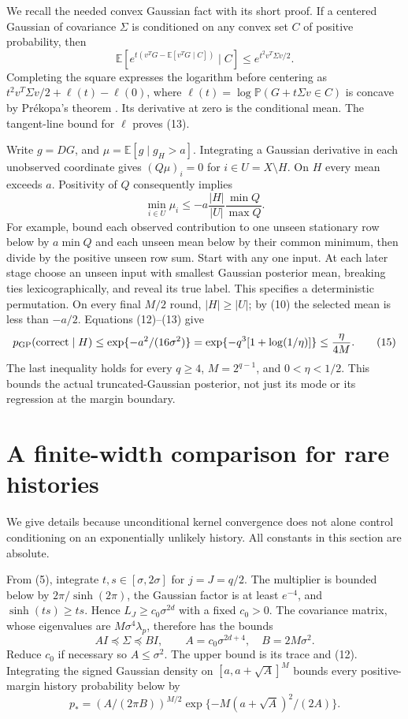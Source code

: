 \documentclass[11pt]{article}
\newcommand{\E}{\mathbb E}\newcommand{\Pp}{\mathbb P}
\begin{document}
We recall the needed convex Gaussian fact with its short proof.
If a centered Gaussian of covariance $\Sigma$ is conditioned on any
convex set $C$ of positive probability, then
\[
 \E[e^{t(v^TG-\E[v^TG\mid C])}\mid C]
                               \le e^{t^2v^T\Sigma v/2}.       \tag{13}
\]
Completing the square expresses the logarithm before centering as
$t^2v^T\Sigma v/2+\ell(t)-\ell(0)$, where
$\ell(t)=\log\Pp(G+t\Sigma v\in C)$ is concave by Pr\'ekopa's
theorem \cite{prekopa}. Its derivative at zero is the conditional
mean. The tangent-line bound for $\ell$ proves (13).

Write $g=DG$, and $\mu=\E[g\mid g_H>a]$.
Integrating a Gaussian derivative in each unobserved coordinate gives
$(Q\mu)_i=0$ for $i\in U=X\setminus H$.
On $H$ every mean exceeds $a$. Positivity of $Q$ consequently implies
\[
 \min_{i\in U}\mu_i
       \le-a\frac{|H|}{|U|}\frac{\min Q}{\max Q}.              \tag{14}
\]
For example, bound each observed contribution to one unseen stationary
row below by $a\min Q$ and each unseen mean below by their common
minimum, then divide by the positive unseen row sum.
Start with any one input. At each later stage choose an unseen input
with smallest Gaussian posterior mean, breaking ties lexicographically,
and reveal its true label. This specifies a deterministic permutation.
On every final $M/2$ round, $|H|\ge|U|$; by (10) the selected mean
is less than $-a/2$. Equations (12)--(13) give
\[
 p_{\rm GP}(\mathrm{correct}\mid H)
    \le\exp\{-a^2/(16\sigma^2)\}
    =\exp\{-q^3[1+\log(1/\eta)]\}\le\frac\eta{4M}.             \tag{15}
\]
The last inequality holds for every $q\ge4$, $M=2^{q-1}$,
and $0<\eta<1/2$. This bounds the actual truncated-Gaussian posterior,
not just its mode or its regression at the margin boundary.

\section{A finite-width comparison for rare histories}
We give details because unconditional kernel convergence does not alone
control conditioning on an exponentially unlikely history. All constants
in this section are absolute.

From (5), integrate $t,s\in[\sigma,2\sigma]$ for $j=J=q/2$.
The multiplier is bounded below by $2\pi/\sinh(2\pi)$, the Gaussian
factor is at least $e^{-4}$, and $\sinh(ts)\ge ts$. Hence
$L_J\ge c_0\sigma^{2d}$ with a fixed $c_0>0$.
The covariance matrix, whose eigenvalues are $M\sigma^4\lambda_p$,
therefore has the bounds
\[
 A I\preceq\Sigma\preceq B I,\qquad
 A=c_0\sigma^{2d+4},\quad B=2M\sigma^2.                        \tag{16}
\]
Reduce $c_0$ if necessary so $A\le\sigma^2$. The upper bound is
its trace and (12).
Integrating the signed Gaussian density on $[a,a+\sqrt A]^M$
bounds every positive-margin history probability below by
\[
 p_*=(A/(2\pi B))^{M/2}
                 \exp\{-M(a+\sqrt A)^2/(2A)\}.                \tag{17}
\]
\end{document}
